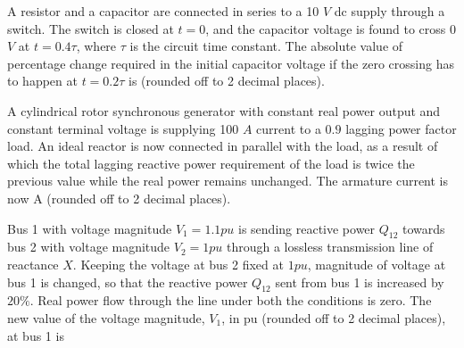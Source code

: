 \item A resistor and a capacitor are connected in series to a 10 $V$ dc supply through a switch. The switch is closed at $t = 0$, and the capacitor voltage is found to cross 0 $V$ at $t = 0.4\tau$, where $\tau$ is the circuit time constant. The absolute value of percentage change required in the initial capacitor voltage if the zero crossing has to happen at $t = 0.2\tau$ is \underline{\hspace{2cm}} (rounded off to 2 decimal places).
\item A cylindrical rotor synchronous generator with constant real power output and constant terminal voltage is supplying 100 $A$ current to a $0.9$ lagging power factor load. An ideal reactor is now connected in parallel with the load, as a result of which the total lagging reactive power requirement of the load is twice the previous value while the real power remains unchanged. The armature current is now \underline{\hspace{2cm}} A (rounded off to 2 decimal places).
\item Bus 1 with voltage magnitude $V_1 = 1.1 pu$ is sending reactive power $Q_{12}$ towards bus 2 with voltage magnitude $V_2 = 1 pu$ through a lossless transmission line of reactance $X$. Keeping the voltage at bus 2 fixed at $1 pu$, magnitude of voltage at bus 1 is changed, so that the reactive power $Q_{12}$ sent from bus 1 is increased by $20\%$. Real power flow through the line under both the conditions is zero. The new value of the voltage magnitude, $V_1$, in pu (rounded off to 2 decimal places), at bus 1 is 





\begin{figure}[!ht]
    \centering
    
    
\end{figure}








